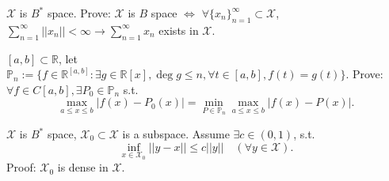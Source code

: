 \documentclass{ctexart}
\newif\ifpreface
\begin{document}
\large
\setlength{\baselineskip}{1.2em}
\ifpreface

\else
\maketitle
\fi
\renewcommand{\bar}{\overline}
\begin{problem}
$\mathscr{X}$ is $B^*$ space. Prove: $\mathscr{X}$ is $B$ space $\iff$ $\forall \{x_n\}_{n=1}^{\infty}\subset \mathscr{X}$, $\sum_{n=1}^{\infty}||x_n||<\infty\rightarrow \sum_{n=1}^{\infty}x_n$ exists in $\mathscr{X}$.
\end{problem}


\begin{problem}
$[a,b]\subset \mathbb{R}$, let $\mathbb{P}_n:=\{f\in \mathbb{R}^{[a,b]}:\exists g\in \mathbb{R}[x],\deg g\leq n,\forall t\in[a,b], f(t)=g(t)\}$. Prove: $\forall f\in C[a,b], \exists P_0\in \mathbb{P}_n$ s.t.
\begin{equation}
\max_{a\leq x\leq b}|f(x)-P_0(x)|=\min_{P\in \mathbb{P}_n}\max_{a\leq x\leq b}|f(x)-P(x)|.
\end{equation}
\end{problem}


\begin{problem}
$\mathscr{X}$ is $B^*$ space, $\mathscr{X}_0\subset \mathscr{X}$ is a subspace. Assume $\exists c\in(0,1)$, s.t.
\begin{equation}
\inf_{x\in \mathscr{X}_0}||y-x||\leq c||y||\quad(\forall y\in \mathscr{X}).
\end{equation}
Proof: $\mathscr{X}_0$ is dense in $\mathscr{X}$.
\end{problem}
\end{document}
